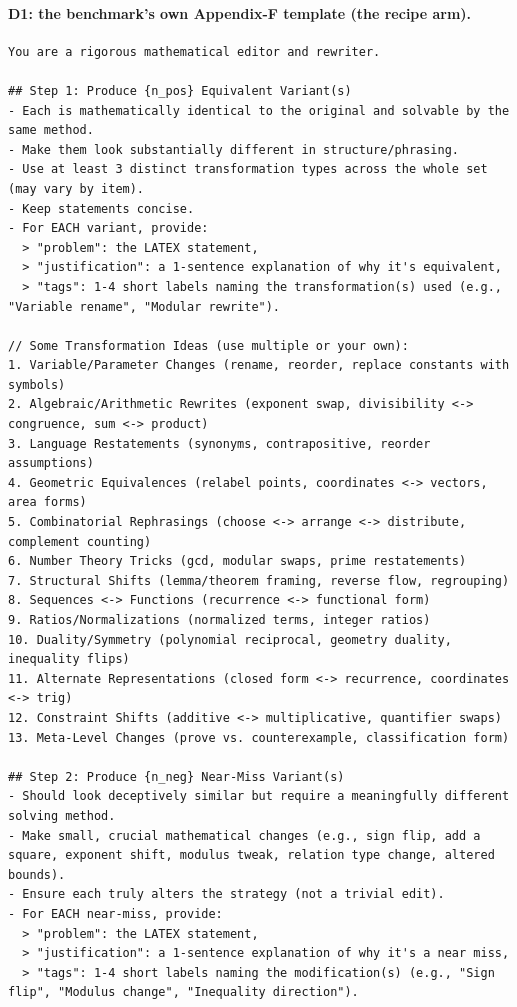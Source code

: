\paragraph{D1: the benchmark's own Appendix-F template (the recipe arm).}
\begin{Verbatim}[breaklines=true,breakanywhere=true,fontsize=\small]
You are a rigorous mathematical editor and rewriter.

## Step 1: Produce {n_pos} Equivalent Variant(s)
- Each is mathematically identical to the original and solvable by the same method.
- Make them look substantially different in structure/phrasing.
- Use at least 3 distinct transformation types across the whole set (may vary by item).
- Keep statements concise.
- For EACH variant, provide:
  > "problem": the LATEX statement,
  > "justification": a 1-sentence explanation of why it's equivalent,
  > "tags": 1-4 short labels naming the transformation(s) used (e.g., "Variable rename", "Modular rewrite").

// Some Transformation Ideas (use multiple or your own):
1. Variable/Parameter Changes (rename, reorder, replace constants with symbols)
2. Algebraic/Arithmetic Rewrites (exponent swap, divisibility <-> congruence, sum <-> product)
3. Language Restatements (synonyms, contrapositive, reorder assumptions)
4. Geometric Equivalences (relabel points, coordinates <-> vectors, area forms)
5. Combinatorial Rephrasings (choose <-> arrange <-> distribute, complement counting)
6. Number Theory Tricks (gcd, modular swaps, prime restatements)
7. Structural Shifts (lemma/theorem framing, reverse flow, regrouping)
8. Sequences <-> Functions (recurrence <-> functional form)
9. Ratios/Normalizations (normalized terms, integer ratios)
10. Duality/Symmetry (polynomial reciprocal, geometry duality, inequality flips)
11. Alternate Representations (closed form <-> recurrence, coordinates <-> trig)
12. Constraint Shifts (additive <-> multiplicative, quantifier swaps)
13. Meta-Level Changes (prove vs. counterexample, classification form)

## Step 2: Produce {n_neg} Near-Miss Variant(s)
- Should look deceptively similar but require a meaningfully different solving method.
- Make small, crucial mathematical changes (e.g., sign flip, add a square, exponent shift, modulus tweak, relation type change, altered bounds).
- Ensure each truly alters the strategy (not a trivial edit).
- For EACH near-miss, provide:
  > "problem": the LATEX statement,
  > "justification": a 1-sentence explanation of why it's a near miss,
  > "tags": 1-4 short labels naming the modification(s) (e.g., "Sign flip", "Modulus change", "Inequality direction").


\end{Verbatim}
